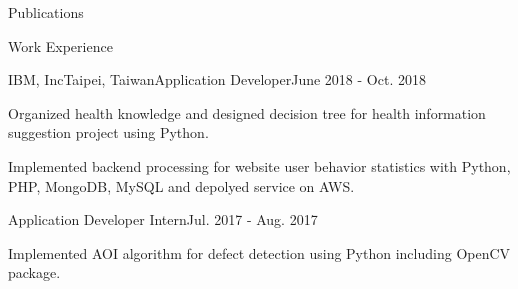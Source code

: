 \documentclass{resume} %
\begin{document}
\begin{rSection}{Publications}
    
    
    \begin{enumerate}[label={[\arabic*]}]
    \item {}
    \item {}
    \item {}
    \item {}
    \end{enumerate}    
\end{rSection}


\begin{rSection}{Work Experience}
    \begin{rSubsection}{IBM, Inc}{Taipei, Taiwan}{Application Developer}{June 2018 - Oct. 2018}
        \item Organized health knowledge and designed decision tree for health information suggestion project using Python.
        \item Implemented backend processing for website user behavior statistics with Python, PHP, MongoDB, MySQL and depolyed service on AWS.
    \end{rSubsection}
    \begin{rSubsection}{}{}{Application Developer Intern}{Jul. 2017 - Aug. 2017}
        \item Implemented AOI algorithm for defect detection using Python including OpenCV package.\quad 
    \end{rSubsection}
\end{rSection}
\end{document}
